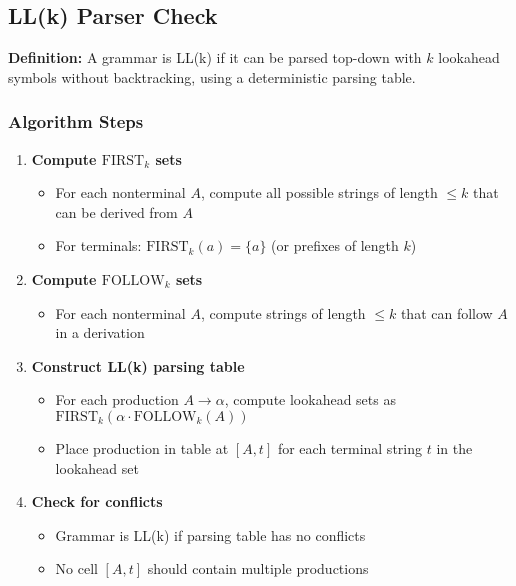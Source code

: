 \subsection{LL(k) Parser Check}

\textbf{Definition:} A grammar is LL(k) if it can be parsed top-down with $k$ lookahead symbols without backtracking, using a deterministic parsing table.

\subsubsection{Algorithm Steps}

\begin{enumerate}
    \item \textbf{Compute $\text{FIRST}_k$ sets}
    \begin{itemize}
        \item For each nonterminal $A$, compute all possible strings of length $\leq k$ that can be derived from $A$
        \item For terminals: $\text{FIRST}_k(a) = \{a\}$ (or prefixes of length $k$)
    \end{itemize}
    
    \item \textbf{Compute $\text{FOLLOW}_k$ sets}
    \begin{itemize}
        \item For each nonterminal $A$, compute strings of length $\leq k$ that can follow $A$ in a derivation
    \end{itemize}
    
    \item \textbf{Construct LL(k) parsing table}
    \begin{itemize}
        \item For each production $A \to \alpha$, compute lookahead sets as $\text{FIRST}_k(\alpha \cdot \text{FOLLOW}_k(A))$
        \item Place production in table at $[A, t]$ for each terminal string $t$ in the lookahead set
    \end{itemize}
    
    \item \textbf{Check for conflicts}
    \begin{itemize}
        \item Grammar is LL(k) if parsing table has no conflicts
        \item No cell $[A, t]$ should contain multiple productions
    \end{itemize}
    
\end{enumerate}


